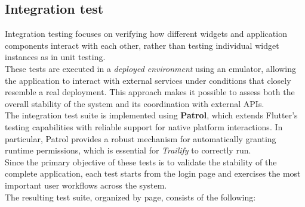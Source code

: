 \documentclass[12pt]{article}
\begin{document}
\subsection{Integration test}
Integration testing focuses on verifying how different widgets and application components interact with each other, rather than testing individual widget instances as in unit testing.\\
These tests are executed in a \textit{deployed environment} using an emulator, allowing the application to interact with external services under conditions that closely resemble a real deployment. This approach makes it possible to assess both the overall stability of the system and its coordination with external APIs.\\
The integration test suite is implemented using \textbf{Patrol}, which extends Flutter's testing capabilities with reliable support for native platform interactions. In particular, Patrol provides a robust mechanism for automatically granting runtime permissions, which is essential for \textit{Trailify} to correctly run.\\
Since the primary objective of these tests is to validate the stability of the complete application, each test starts from the login page and exercises the most important user workflows across the system.\\
The resulting test suite, organized by page, consists of the following:
\end{document}
